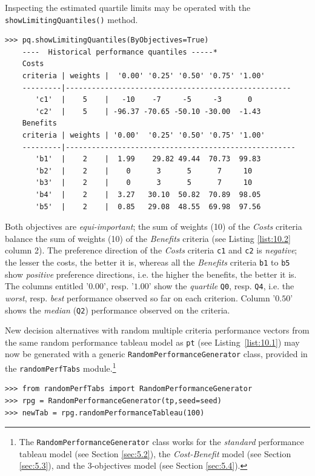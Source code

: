 Inspecting the estimated quartile limits may be operated with the \texttt{showLimitingQuantiles()} method.
\begin{lstlisting}[caption={Printing out the estimated quartile limits},label=list:10.2]
>>> pq.showLimitingQuantiles(ByObjectives=True)
    ----  Historical performance quantiles -----*
    Costs
    criteria | weights |  '0.00' '0.25' '0.50' '0.75' '1.00'   
    ---------|----------------------------------------------------
       'c1'  |    5    |   -10    -7     -5     -3      0  
       'c2'  |    5    | -96.37 -70.65 -50.10 -30.00  -1.43  
    Benefits
    criteria | weights | '0.00'  '0.25' '0.50' '0.75' '1.00'   
    ---------|-----------------------------------------------------
       'b1'  |    2    |  1.99    29.82 49.44  70.73  99.83  
       'b2'  |    2    |    0      3      5      7     10  
       'b3'  |    2    |    0      3      5      7     10  
       'b4'  |    2    |  3.27   30.10  50.82  70.89  98.05  
       'b5'  |    2    |  0.85   29.08  48.55  69.98  97.56  
\end{lstlisting}
Both objectives are \emph{equi-important}; the sum of weights (10) of the \emph{Costs} criteria balance the sum of weights (10) of the \emph{Benefits} criteria (see Listing \ref{list:10.2} column 2). The preference direction of the \emph{Costs} criteria \texttt{c1} and \texttt{c2} is \emph{negative}; the lesser the costs, the better it is, whereas all the \emph{Benefits} criteria \texttt{b1} to \texttt{b5} show \emph{positive} preference directions, i.e. the higher the benefits, the better it is. The columns entitled '$0.00$', resp. '$1.00$' show the \emph{quartile} \texttt{Q0}, resp. \texttt{Q4}, i.e. the \emph{worst}, resp. \emph{best} performance observed so far on each criterion. Column '$0.50$' shows the \emph{median} (\texttt{Q2}) performance observed on the criteria.  

New  decision alternatives with random multiple criteria performance vectors from the same random performance tableau model as \texttt{pt} (see Listing~\ref{list:10.1}) may now be generated with a generic \texttt{RandomPerformanceGenerator} class, provided in the \texttt{randomPerfTabs} module.\footnote{The \texttt{RandomPerformanceGenerator} class works for the \emph{standard} performance tableau model (see Section \ref{sec:5.2}), the \emph{Cost-Benefit} model (see Section \ref{sec:5.3}), and the 3-objectives model (see Section \ref{sec:5.4}).}
\begin{lstlisting}[caption={Generating 100 new random decision alternatives of the same model},label=list:10.3]
>>> from randomPerfTabs import RandomPerformanceGenerator
>>> rpg = RandomPerformanceGenerator(tp,seed=seed)
>>> newTab = rpg.randomPerformanceTableau(100)
\end{lstlisting}

